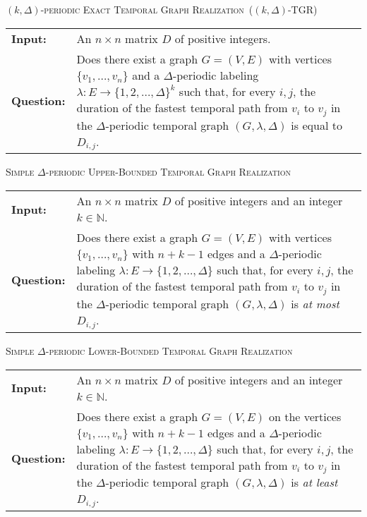 \documentclass[a4paper,UKenglish,cleveref, autoref, thm-restate]{lipics-v2021}
\makeatletter
\newcommand{\problemdef}[3]{
	\begin{center}
		\begin{minipage}{0.95\textwidth}
			\noindent
			#1
			\vspace{5pt}\\
			\setlength{\tabcolsep}{3pt}
			\begin{tabularx}{\textwidth}{@{}lX@{}}
				\textbf{Input:}& #2 \\
				\textbf{Question:}& #3
			\end{tabularx}
		\end{minipage}
	\end{center}
}
\newcommand{\kDeltaExactLong}{\textsc{$(k,\Delta)$-periodic Exact Temporal Graph Realization}}
\newcommand{\kDeltaExact}{\textsc{$(k,\Delta)$-TGR}}
\newcommand{\DeltaUpperBoundLong}{\textsc{Simple $\Delta$-periodic Upper-Bounded Temporal Graph Realization}}
\newcommand{\kDeltaLowerBoundLong}{\textsc{Simple $\Delta$-periodic Lower-Bounded Temporal Graph Realization}}
\makeatother
\begin{document}
\problemdef{\kDeltaExactLong\ (\kDeltaExact)}
{An $n \times n$ matrix $D$ of positive integers.}
{Does there exist a graph $G=(V,E)$ with vertices $\{v_1,\ldots,v_{n}\}$ 
and a $\Delta$-periodic labeling $\lambda: E \rightarrow \{1,2,\ldots,\Delta\}^k$ such that, 
for every $i,j$, the duration of the fastest temporal path from $v_i$ to $v_j$ in the $\Delta$-periodic temporal graph $(G,\lambda,\Delta)$ is equal to $D_{i,j}$.}

\problemdef{\DeltaUpperBoundLong}
{An $n \times n$ matrix $D$ of positive integers and an integer $k\in \mathbb{N}$.}
{Does there exist a graph $G=(V,E)$ with vertices $\{v_1,\ldots,v_{n}\}$ with $n+k-1$ edges 
	and a $\Delta$-periodic labeling $\lambda: E \rightarrow \{1,2,\ldots,\Delta\}$ such that, 
	for every $i,j$, the duration of the fastest temporal path from $v_i$ to $v_j$ in the $\Delta$-periodic temporal graph $(G,\lambda,\Delta)$ is \emph{at most} $D_{i,j}$.}

\problemdef{\kDeltaLowerBoundLong}
{An $n \times n$ matrix $D$ of positive integers and an integer $k\in \mathbb{N}$.}
{Does there exist a graph $G=(V,E)$ on the vertices $\{v_1,\ldots,v_{n}\}$ with $n+k-1$ edges 
and a $\Delta$-periodic labeling $\lambda: E \rightarrow \{1,2,\ldots,\Delta\}$ such that, 
for every $i,j$, the duration of the fastest temporal path from $v_i$ to $v_j$ in the $\Delta$-periodic temporal graph $(G,\lambda,\Delta)$ is \emph{at least} $D_{i,j}$.}


	
\end{document}
